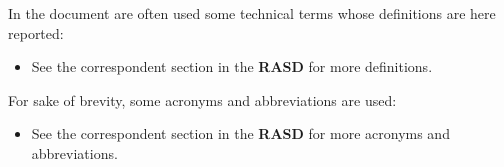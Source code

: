 In the document are often used some technical terms whose definitions are here reported:
\begin{itemize}
	 A software level in a software system.
	 An hardware level in a software system.
	 A digital database whose organisation is based on the relational model of data, as proposed by E.F. Codd in 1970.
	 A strict application of MVC principles.
	\item See the correspondent section in the \textbf{RASD} for more definitions.
\end{itemize}
For sake of brevity, some acronyms and abbreviations are used:
\begin{itemize}
	 Design Document.
	 Global Positioning System.
	 Graphic User Interface.
	 Application Programming Interface.
	 Model View Controller.
	 Estimated Time of Arrival.
	\item See the correspondent section in the \textbf{RASD} for more acronyms and abbreviations.
\end{itemize}
